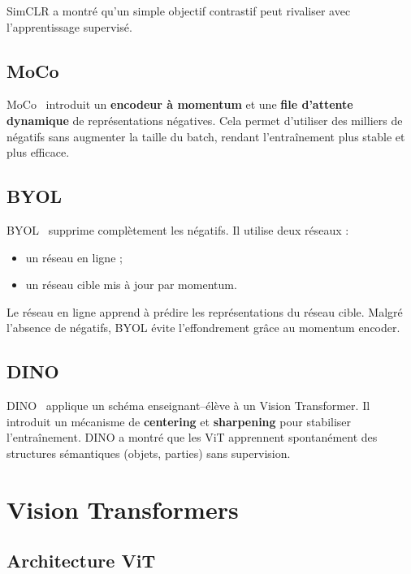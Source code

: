 \documentclass[12pt,a4paper]{report}
\begin{document}
	SimCLR a montré qu’un simple objectif contrastif peut rivaliser avec l’apprentissage supervisé.
	
	\subsection{MoCo}
	
	MoCo~\cite{He2020} introduit un \textbf{encodeur à momentum} et une \textbf{file d’attente dynamique} de représentations négatives.  
	Cela permet d’utiliser des milliers de négatifs sans augmenter la taille du batch, rendant l’entraînement plus stable et plus efficace.
	
	\subsection{BYOL}
	
	BYOL~\cite{Grill2020} supprime complètement les négatifs.  
	Il utilise deux réseaux :
	\begin{itemize}
		\item un réseau en ligne ;
		\item un réseau cible mis à jour par momentum.
	\end{itemize}
	
	Le réseau en ligne apprend à prédire les représentations du réseau cible.  
	Malgré l’absence de négatifs, BYOL évite l’effondrement grâce au momentum encoder.
	
	\subsection{DINO}
	
	DINO~\cite{Caron2021} applique un schéma enseignant–élève à un Vision Transformer.  
	Il introduit un mécanisme de \textbf{centering} et \textbf{sharpening} pour stabiliser l’entraînement.  
	DINO a montré que les ViT apprennent spontanément des structures sémantiques (objets, parties) sans supervision.
	
	\section{Vision Transformers}
	
	\subsection{Architecture ViT}
	
\end{document}
